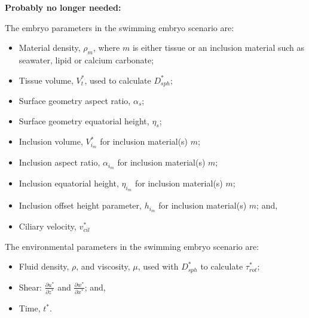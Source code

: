 \documentclass[10pt,a4paper]{article}
\def\p{\partial}
\begin{document}
\newpage

\textbf{Probably no longer needed:}
\vspace{2cm}

The embryo parameters in the swimming embryo scenario are:
\begin{itemize}
	\item Material density, $\rho_m$, where $m$ is either tissue or an inclusion material such as seawater, lipid or calcium carbonate;
	\item Tissue volume, $V^*_t$, used to calculate $D_{sph}^*$;
	\item Surface geometry aspect ratio, $\alpha_s$;
	\item Surface geometry equatorial height, $\eta_s$;
	\item Inclusion volume, $V^*_{i_m}$ for inclusion material(s) $m$;
	\item Inclusion aspect ratio, $\alpha_{i_m}$ for inclusion material(s) $m$;
	\item Inclusion equatorial height, $\eta_{i_m}$ for inclusion material(s) $m$;
	\item Inclusion offset height parameter, $h_{i_m}$ for inclusion material(s) $m$; and,
	\item Ciliary velocity, $v^*_{cil}$
\end{itemize}
The environmental parameters in the swimming embryo scenario are:
\begin{itemize}
	\item Fluid density, $\rho$, and viscosity, $\mu$, used with $D_{sph}^*$ to calculate $\tau^*_{rot}$; 
	\item Shear: $\frac{\p u^*}{\p z^*}$ and $\frac{\p w^*}{\p x^*}$; and,
	\item Time, $t^*$.
\end{itemize}
\end{document}
